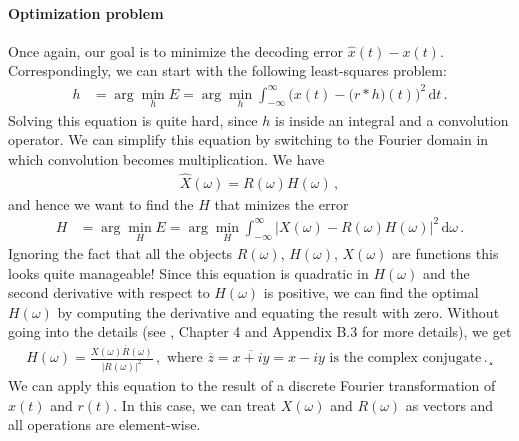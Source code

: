 \documentclass[10pt,letterpaper,oneside]{article}
\begin{document}
\paragraph{Optimization problem}
Once again, our goal is to minimize the decoding error $\hat x(t) - x(t)$. Correspondingly, we can start with the following least-squares problem:
\begin{align*}
	h &= \arg\min_{h} E = \arg\min_{h} \int_{-\infty}^\infty \Big( x(t) - \big(r \ast h\big)(t) \Big)^2 \,\mathrm{d}t \,.
\end{align*}
Solving this equation is quite hard, since $h$ is inside an integral and a convolution operator. We can simplify this equation by switching to the Fourier domain in which convolution becomes multiplication. We have
\begin{align*}
	\hat{X}(\omega) = R(\omega)H(\omega) \,,
\end{align*}
and hence we want to find the $H$ that minizes the error
\begin{align*}
	H &= \arg\min_{H} E = \arg\min_{H} \int_{-\infty}^{\infty} \big| X(\omega) - R(\omega) H(\omega) \big|^2 \,\mathrm{d}\omega \,.
\end{align*}
Ignoring the fact that all the objects $R(\omega)$, $H(\omega)$, $X(\omega)$ are functions this looks quite manageable! Since this equation is quadratic in $H(\omega)$ and the second derivative with respect to $H(\omega)$ is positive, we can find the optimal $H(\omega)$ by computing the derivative and equating the result with zero. Without going into the details (see \cite{eliasmith2003neural}, Chapter 4 and Appendix B.3 for more details), we get
\begin{align*}
		H(\omega) = \frac{X(\omega) \overline{R}(\omega)}{|R(\omega)|^2} \,, \text{ where } \overline{z} = \overline{x + iy} = x - iy \text{ is the complex conjugate} \,.¸
\end{align*}
We can apply this equation to the result of a discrete Fourier transformation of $x(t)$ and $r(t)$. In this case, we can treat $X(\omega)$ and $R(\omega)$ as vectors and all operations are element-wise.
\end{document}
